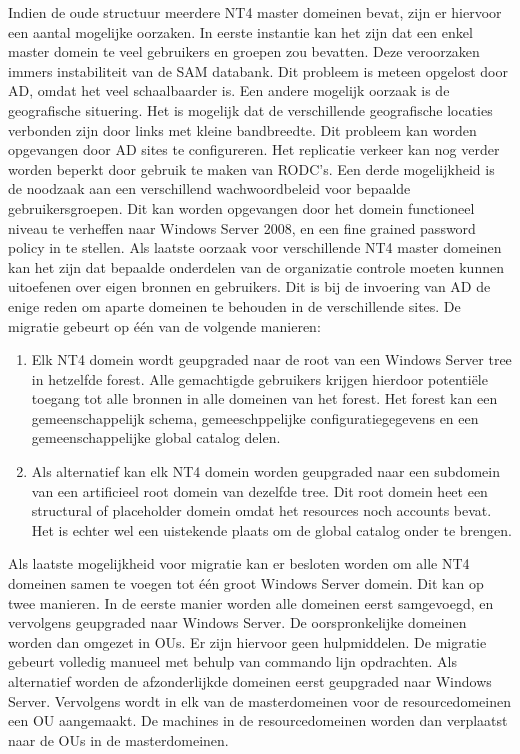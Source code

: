 Indien de oude structuur meerdere NT4 master domeinen bevat, zijn er hiervoor
een aantal mogelijke oorzaken. In eerste instantie kan het zijn dat een enkel
master domein te veel gebruikers en groepen zou bevatten. Deze veroorzaken
immers instabiliteit van de SAM databank. Dit probleem is meteen opgelost door
AD, omdat het veel schaalbaarder is. Een andere mogelijk oorzaak is de
geografische situering. Het is mogelijk dat de verschillende geografische
locaties verbonden zijn door links met kleine bandbreedte. Dit probleem kan
worden opgevangen door AD sites te configureren. Het replicatie verkeer kan nog
verder worden beperkt door gebruik te maken van RODC's. Een derde mogelijkheid
is de noodzaak aan een verschillend wachwoordbeleid voor bepaalde
gebruikersgroepen. Dit kan worden opgevangen door het domein functioneel niveau
te verheffen naar Windows Server 2008, en een fine grained password policy in te
stellen. Als laatste oorzaak voor verschillende NT4 master domeinen kan het zijn
dat bepaalde onderdelen van de organizatie controle moeten kunnen uitoefenen
over eigen bronnen en gebruikers. Dit is bij de invoering van AD de enige reden
om aparte domeinen te behouden in de verschillende sites. De migratie gebeurt op
één van de volgende manieren:
\begin{enumerate}
	\item Elk NT4 domein wordt geupgraded naar de root van een Windows
		Server tree in hetzelfde forest. Alle gemachtigde gebruikers
		krijgen hierdoor potentiële toegang tot alle bronnen in alle
		domeinen van het forest. Het forest kan een gemeenschappelijk
		schema, gemeeschppelijke configuratiegegevens en een
		gemeenschappelijke global catalog delen.
	\item Als alternatief kan elk NT4 domein worden geupgraded naar een
		subdomein van een artificieel root domein van dezelfde tree. Dit
		root domein heet een structural of placeholder domein omdat het
		resources noch accounts bevat. Het is echter wel een uistekende
		plaats om de global catalog onder te brengen.
\end{enumerate}

Als laatste mogelijkheid voor migratie kan er besloten worden om alle NT4
domeinen samen te voegen tot één groot Windows Server domein. Dit kan op twee
manieren. In de eerste manier worden alle domeinen eerst samgevoegd, en
vervolgens geupgraded naar Windows Server. De oorspronkelijke domeinen worden
dan omgezet in OUs. Er zijn hiervoor geen hulpmiddelen. De migratie gebeurt
volledig manueel met behulp van commando lijn opdrachten. Als alternatief worden
de afzonderlijkde domeinen eerst geupgraded naar Windows Server. Vervolgens
wordt in elk van de masterdomeinen voor de resourcedomeinen een OU aangemaakt.
De machines in de resourcedomeinen worden dan verplaatst naar de OUs in de
masterdomeinen.
